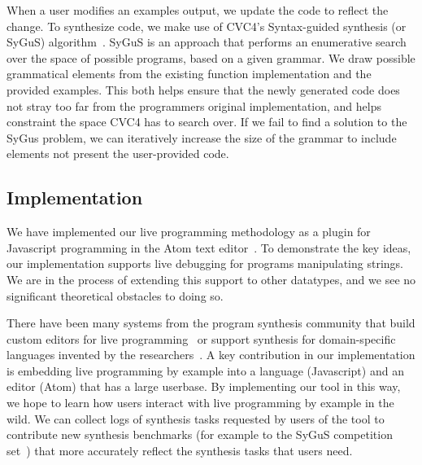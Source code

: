 When a user modifies an examples output, we update the code to reflect the change.
To synthesize code, we make use of CVC4's Syntax-guided synthesis (or SyGuS) algorithm~\cite{reynolds2017sygus}.
SyGuS is an approach that performs an enumerative search over the space of possible programs,
based on a given grammar.
We draw possible grammatical elements from the existing function implementation and the provided examples.
This both helps ensure that the newly generated code does not stray too far from the programmers original implementation,
and helps constraint the space CVC4 has to search over.
If we fail to find a solution to the SyGus problem, we can iteratively increase the size of the grammar to include elements not present the user-provided code.

\subsection{Implementation}
We have implemented our live programming methodology as a plugin
for Javascript programming in the Atom text editor~\cite{Atom}.
To demonstrate the key ideas, our implementation supports live debugging for programs manipulating strings.
We are in the process of extending this support to other datatypes,
and we see no significant theoretical obstacles to doing so.

There have been many systems from the program synthesis community that build custom editors for live programming~\cite{Mayer} or support synthesis for domain-specific languages invented by the researchers~\cite{omar2018live}.
A key contribution in our implementation is embedding live programming by example into a language (Javascript) and an editor (Atom) that has a large userbase.
By implementing our tool in this way, we hope to learn how users interact with live programming by example in the wild.
We can collect logs of synthesis tasks requested by users of the tool to contribute new synthesis benchmarks (for example to the SyGuS competition set~\cite{alur2017sygus}) that more accurately reflect the synthesis tasks that users need.

